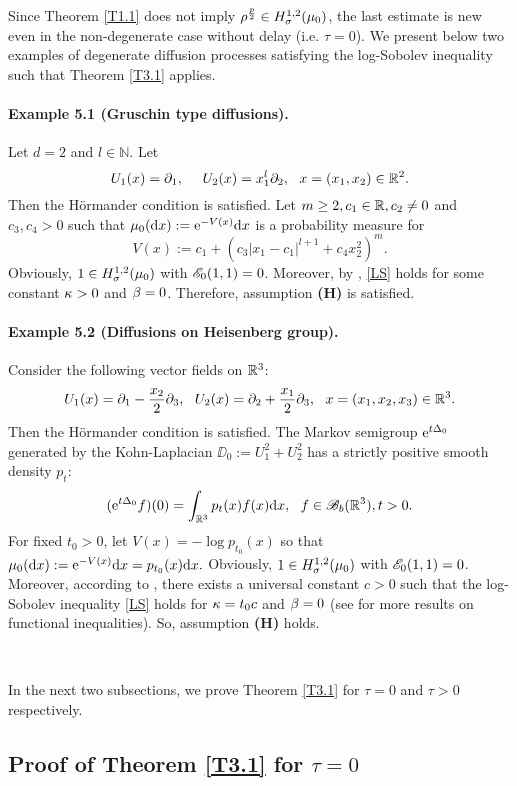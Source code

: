 \documentclass[12pt,leqno]{article}
\theoremstyle{definition}
\numberwithin{equation}{section} \theoremstyle{remark}
\begin{document}
  Since  Theorem \ref{T1.1} does not imply $\rho^{\frac p 2}\in H^{1,2}_\sigma(\mu_0)$, the last estimate is new even in the non-degenerate case   without delay (i.e. $\tau=0$).
We present below two examples of degenerate diffusion processes satisfying the log-Sobolev inequality such that Theorem \ref{T3.1} applies.

 \paragraph{Example 5.1 (Gruschin type diffusions).} Let $d=2$ and $l\in\mathbb N.$ Let
 $$U_1(x)= \partial_1,\ \ \ \ U_2(x)= x_1^l \partial_2,\ \ x=(x_1,x_2)\in\mathbb R^2.$$ Then the H\"ormander condition is satisfied. Let $m\ge 2, c_1\in\mathbb R, c_2\ne 0$ and $c_3,c_4>0$ such that $\mu_0(\text{\rm{d}} x):=\text{\rm{e}}^{-V(x)}\text{\rm{d}} x$ is a probability measure for
 $$V(x):= c_1 + (c_3|x_1-c_1|^{l+1}+c_4 x_2^2)^m.$$ Obviously, $1\in H_\sigma^{1,2}(\mu_0)$ with $\mathscr E_0(1,1)=0$. Moreover, by \cite[Proposition 4.1]{W09}, \eqref{LS} holds for some constant $\kappa>0$ and $\beta=0$. Therefore,  assumption {\bf (H)} is satisfied.




\paragraph{Example 5.2 (Diffusions on Heisenberg group).} Consider the following vector fields on $\mathbb R^3$:
$$U_1(x)=  \partial_1 - \frac {x_2} 2  \partial_3,\ \  U_2(x)= \partial_2 +\frac {x_1} 2 \partial_3,\ \ x=(x_1,x_2,x_3)\in\mathbb R^3.$$ Then the H\"ormander condition is satisfied. The Markov semigroup $\text{\rm{e}}^{t\Delta_0}$ generated by  the Kohn-Laplacian $\DD_0:=U_1^2 +U_2^2$   has a strictly positive smooth density $p_t$:
$$(\text{\rm{e}}^{t\Delta_0}f)(0)= \int_{\mathbb R^3} p_t(x) f(x)\text{\rm{d}} x,\ \ f\in \mathscr B_b(\mathbb R^3), t>0.$$
For fixed $t_0>0$, let  $V(x)=-\log p_{t_0}(x)$ so that $\mu_0(\text{\rm{d}} x):= \text{\rm{e}}^{-V(x)}\text{\rm{d}} x= p_{t_0}(x)\text{\rm{d}} x.$   Obviously, $1\in H_\sigma^{1,2}(\mu_0)$ with $\mathscr E_0(1,1)=0$. Moreover, according to \cite[Corollary 1.2]{Li}, there exists a universal constant $c>0$ such that the log-Sobolev inequality \eqref{LS} holds for $\kappa=t_0c$ and $\beta=0$ (see \cite{W*} for more results on functional inequalities).
So, assumption {\bf (H)} holds.

\

In the next two subsections, we   prove Theorem \ref{T3.1} for $\tau=0$ and $\tau>0$ respectively.

\subsection{Proof of Theorem \ref{T3.1} for $\tau=0$}
\end{document}
